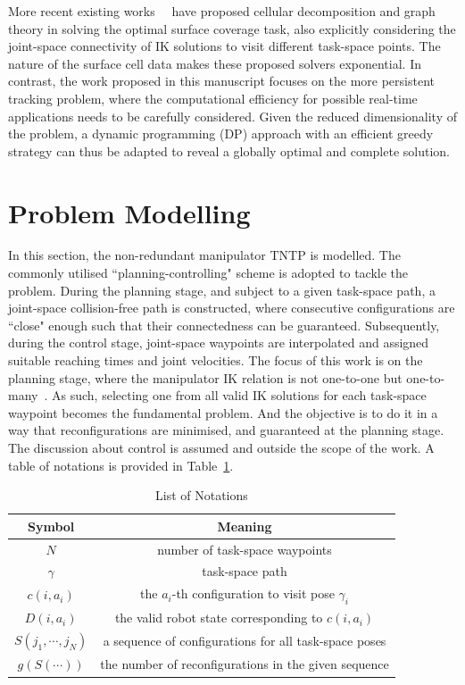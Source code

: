 \documentclass[letterpaper, 10 pt, journal, twoside]{ieeetran}  %
\begin{document}
More recent existing works~\cite{Yang2020Cellular}~\cite{Yang2020Nonrevisiting} have proposed cellular decomposition and graph theory in solving the optimal surface coverage task, also explicitly considering the joint-space connectivity of IK solutions to visit different task-space points. 
The nature of the surface cell data makes these proposed solvers exponential. 
In contrast, the work proposed in this manuscript focuses on the more persistent tracking problem, where the computational efficiency for possible real-time applications needs to be carefully considered. Given the reduced dimensionality of the problem, a dynamic programming (DP) approach with an efficient greedy strategy can thus be adapted to reveal a globally optimal and complete solution. 


\section{Problem Modelling}\label{section:modelling}
In this section, the non-redundant manipulator TNTP is modelled. The commonly utilised ``planning-controlling" scheme is adopted to tackle the problem. During the planning stage, 
and subject to a given task-space path, a joint-space collision-free path is constructed, where consecutive configurations are ``close" enough such that their connectedness can be guaranteed. 
Subsequently, during the control stage, joint-space waypoints are interpolated and assigned suitable reaching times and joint velocities. 
The focus of this work is on the planning stage, where the manipulator IK relation is not one-to-one but one-to-many~\cite{Lavalle2006Planning}. 
As such, selecting one from all valid IK solutions for each task-space waypoint becomes the fundamental problem. And the objective is to do it in a way that reconfigurations are minimised, and guaranteed at the planning stage. 
The discussion about control is assumed and outside the scope of the work. 
A table of notations is provided in Table~\ref{tab:notations}.


\begin{table}
\begin{center}
\caption{List of Notations}
\label{tab:notations}
\begin{tabular}{ c | c }
\hline
Symbol & Meaning\\
\hline
\hline
$N$ & number of task-space waypoints\\
\hline
$\gamma$ & task-space path\\ 
\hline
$c(i, a_i)$ & the $a_i$-th configuration to visit pose $\gamma_i$\\
\hline
$D(i, a_i)$ & the valid robot state corresponding to $c(i, a_i)$\\
\hline
$S(j_1, \cdots, j_N)$ & a sequence of configurations for all task-space poses\\
\hline
$g(S(\cdots))$ & the number of reconfigurations in the given sequence\\
\hline 
\end{tabular}
\end{center}
\vspace{-0.3cm}
\end{table}
\end{document}
